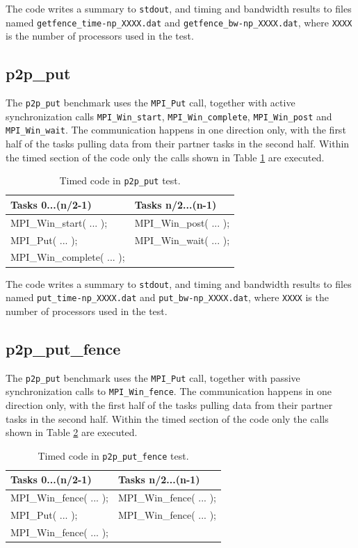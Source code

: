 \documentclass[10pt,a4paper]{report}
\begin{document}
The code writes a summary to \verb+stdout+, and timing and bandwidth results to files named \verb+getfence_time-np_XXXX.dat+ and \verb+getfence_bw-np_XXXX.dat+, where \verb+XXXX+ is the number of processors used in the test.

\FloatBarrier
\subsection{p2p\_put}
The \verb+p2p_put+ benchmark uses the \verb+MPI_Put+ call, together with active synchronization calls \verb+MPI_Win_start+, \verb+MPI_Win_complete+, \verb+MPI_Win_post+ and \verb+MPI_Win_wait+. The communication happens in one direction only, with the first half of the tasks pulling data from their partner tasks in the second half. Within the timed section of the code only the calls shown in Table \ref{tab:put} are executed.

\begin{table}[ht]
\centering
\caption{Timed code in \texttt{p2p\_put} test.}
\label{tab:put}
\begin{tabular}{|l|l|}
\hline
\bf{Tasks 0...(n/2-1)}	   & \bf{Tasks n/2...(n-1)}\\\hline
MPI\_Win\_start( ... );    & MPI\_Win\_post( ... );\\
MPI\_Put( ... );           & MPI\_Win\_wait( ... );\\
MPI\_Win\_complete( ... ); & \\\hline
\end{tabular}
\end{table}

The code writes a summary to \verb+stdout+, and timing and bandwidth results to files named \verb+put_time-np_XXXX.dat+ and \verb+put_bw-np_XXXX.dat+, where \verb+XXXX+ is the number of processors used in the test.

\FloatBarrier
\subsection{p2p\_put\_fence}
The \verb+p2p_put+ benchmark uses the \verb+MPI_Put+ call, together with passive synchronization calls to \verb+MPI_Win_fence+. The communication happens in one direction only, with the first half of the tasks pulling data from their partner tasks in the second half. Within the timed section of the code only the calls shown in Table \ref{tab:put_fence} are executed.

\begin{table}[ht]
\centering
\caption{Timed code in \texttt{p2p\_put\_fence} test.}
\label{tab:put_fence}
\begin{tabular}{|l|l|}
\hline
\bf{Tasks 0...(n/2-1)}	   & \bf{Tasks n/2...(n-1)}\\\hline
MPI\_Win\_fence( ... );    & MPI\_Win\_fence( ... );\\
MPI\_Put( ... );           & MPI\_Win\_fence( ... );\\
MPI\_Win\_fence( ... ); & \\\hline
\end{tabular}
\end{table}
\end{document}
